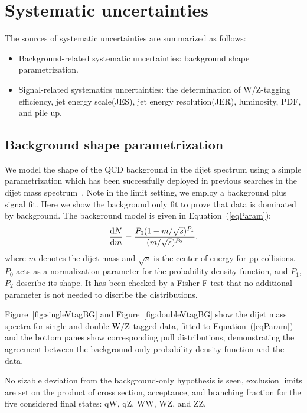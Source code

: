 \section{Systematic uncertainties}
\label{sec:systematics1}
The sources of systematic uncertainties are summarized as
follows:
\begin{itemize}
\item Background-related systematic uncertainties: background shape parametrization.
\item Signal-related systematics uncertainties: the determination of W/Z-tagging efficiency, jet energy scale(JES), jet energy resolution(JER), luminosity, PDF, and pile up.
\end{itemize}

\subsection{Background shape parametrization}
\label{sec:background1}

We model the shape of the QCD background in the dijet spectrum 
using a simple parametrization which has been successfully deployed in
previous searches in the dijet mass spectrum~\cite{cmsdijet}.
Note in the limit setting, we employ a background plus signal fit. Here
we show the background only fit to prove that data is dominated by background. 
The background model is given in Equation~(\ref{eqParam}):
\begin{equation}
\frac{{\rm d}N}{{\rm d}m} = 
\frac{P_{0} (1 - m/\sqrt{s})^{P_{1}}}{(m/\sqrt{s})^{P_{2}
}} .
\label{eqParam}
\end{equation}
\noindent where $m$ denotes the dijet mass and $\sqrt{s}$  is the center of energy for pp collisions.
$P_0$ acts as a normalization parameter for the probability
density function, and $P_1$, $P_2$ describe its shape.
It has been checked by a Fisher F-test that no additional parameter is not needed to discribe the distributions.

Figure~\ref{fig:singleVtagBG} and Figure~\ref{fig:doubleVtagBG} show the dijet mass spectra for
single and double ${\rm W}/{\rm Z}$-tagged data, fitted to Equation~(\ref{eqParam}) and the bottom panes show corresponding pull
distributions, demonstrating the agreement between the background-only
probability density function and the data.

No sizable deviation from the background-only hypothesis is seen,
exclusion limits are set on the product of cross section, acceptance, and branching fraction for
the five considered final states: qW, qZ, WW, WZ, and ZZ.


